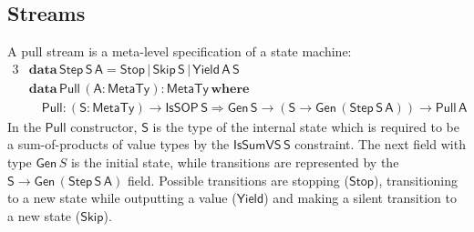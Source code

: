 \documentclass[acmsmall,screen,review,anonymous]{acmart}
\newcommand{\msf}[1]{{\mathsf{#1}}}
\newcommand{\mbf}[1]{{\mathbf{#1}}}
\newcommand{\ind}{\hspace{1em}}
\newcommand{\data}{\mbf{data}\,}
\newcommand{\where}{\mbf{where}}
\newcommand{\vA}{\mathsf{A}}
\newcommand{\vS}{\mathsf{S}}
\newcommand{\IsSOP}{\msf{IsSOP}}
\newcommand{\MTy}{\msf{MetaTy}}
\theoremstyle{remark}
\newcommand{\Gen}{\msf{Gen}}
\newcommand{\RA}{\Rightarrow}
\newcommand{\Stop}{\msf{Stop}}
\newcommand{\Skip}{\msf{Skip}}
\newcommand{\Yield}{\msf{Yield}}
\newcommand{\IsSumVS}{\msf{IsSumVS}}
\newcommand{\Step}{\msf{Step}}
\newcommand{\Pull}{\msf{Pull}}
\begin{document}
\subsection{Streams}

A pull stream is a meta-level specification of a state machine:
\begin{alignat*}{3}
  & \data \Step\,\vS\,\vA = \Stop\,|\,\Skip\,\vS\,|\,\Yield\,\vA\,\vS\\
  & \data \Pull\,(\vA : \MTy) : \MTy\,\where\\
  & \ind \Pull : (\vS : \MTy) \to \IsSOP\,\vS \RA \Gen\,\vS \to (\vS \to \Gen\,(\Step\,\vS\,\vA)) \to \Pull\,\vA
\end{alignat*}
In the $\Pull$ constructor, $\vS$ is the type of the internal state which is
required to be a sum-of-products of value types by the $\IsSumVS\,\vS$
constraint. The next field with type $\Gen\,S$ is the initial state, while transitions
are represented by the $\vS \to \Gen\,(\Step\,\vS\,\vA)$ field. Possible transitions
are stopping ($\Stop$), transitioning to a new state while outputting a value
($\Yield$) and making a silent transition to a new state ($\Skip$).
\end{document}
